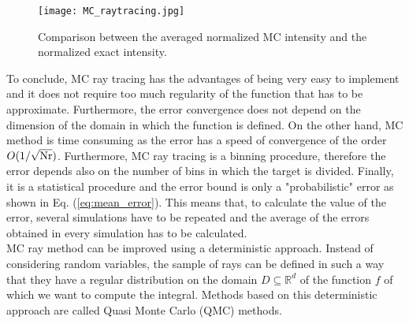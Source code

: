 \begin{figure}[t]
\begin{center}
    \texttt{[image: MC\_raytracing.jpg]}
    \caption{Comparison between the averaged normalized MC intensity and the normalized exact intensity.}
   \label{fig:mc_intensity}
\end{center}
\end{figure}
To conclude, MC ray tracing has the advantages of being very easy to implement and it does not require too much regularity of the function that has to be approximate. Furthermore, the error convergence does not depend on the dimension of the domain in which the function is defined.
On the other hand, MC method is time consuming as the error has a speed of convergence of the order $O(1/\sqrt{\textrm{Nr}})$. Furthermore, MC ray tracing is a binning procedure, therefore the error depends also on the number of bins in which the target is divided. Finally, it is a statistical procedure and the error bound is only a "probabilistic" error as shown in Eq. (\ref{eq:mean_error}). This means that, to calculate the value of the error, several simulations have to be repeated and the average of the errors obtained in every simulation has to be calculated. \\ \indent MC ray method can be improved using a deterministic approach.
Instead of considering random variables, the sample of rays can be defined in such a way that they have a regular distribution on the domain $D\subseteq\mathbb{R}^d$ of the function $f$ of which we want to compute the integral. Methods based on this deterministic approach are called Quasi Monte Carlo (QMC) methods.
